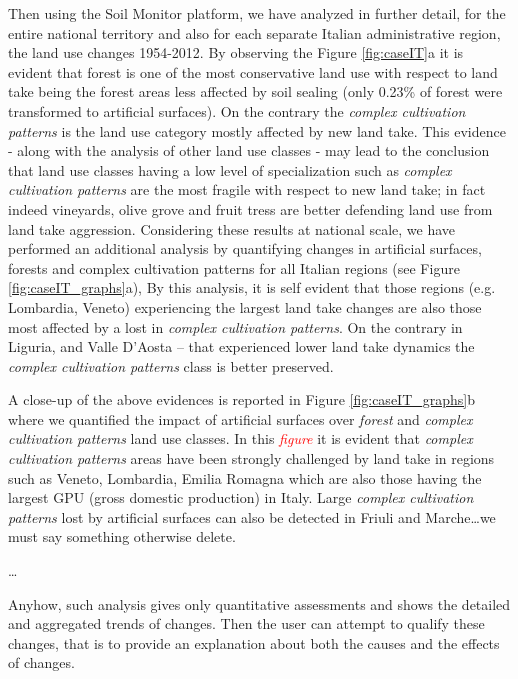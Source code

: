 \documentclass[APA,LATO1COL,doublespace]{WileyNJD-v2}
\newcommand{\toberevised}[1]{\emph{\textcolor{red}{#1}}} %
\begin{document}
Then using the Soil Monitor platform, we have analyzed in further detail, for the entire national territory and also for each separate Italian administrative region, the land use changes 1954-2012.  By observing the Figure \ref{fig:caseIT}a it is evident that forest is one of the most conservative land use with respect to land take being the forest areas less affected by soil sealing (only 0.23\% of forest were transformed to artificial surfaces). On the contrary the \textit{complex cultivation patterns} is the land use category mostly affected by new land take. This evidence - along with the analysis of other land use classes - may lead to the conclusion that land use classes having a low level of specialization such as \textit{complex cultivation patterns} are the most fragile with respect to new land take; in fact indeed vineyards, olive grove and fruit tress are better defending land use from land take aggression. 
Considering these results at national scale, we have performed an additional analysis by quantifying changes in artificial surfaces, forests and complex cultivation patterns for all Italian regions (see Figure \ref{fig:caseIT_graphs}a), By this analysis, it is self evident that those regions (e.g. Lombardia, Veneto) experiencing  the largest land take changes are also those most affected by a lost in \textit{complex cultivation patterns}. On the contrary in Liguria, and Valle D’Aosta – that experienced lower land take dynamics the \textit{complex cultivation patterns} class is better preserved.

A close-up of the above evidences is reported in Figure \ref{fig:caseIT_graphs}b where we quantified the impact of artificial surfaces over \textit{forest} and \textit{complex cultivation patterns} land use classes. In this \toberevised{figure} it is evident that \textit{complex cultivation patterns} areas have been strongly challenged by land take in regions such as Veneto, Lombardia, Emilia Romagna which are also those having the largest GPU (gross domestic production) in Italy. Large \textit{complex cultivation patterns} lost by artificial surfaces can also be detected in Friuli and Marche\ldots we must say something otherwise delete.



\ldots

Anyhow, such analysis gives only quantitative assessments and shows the detailed and aggregated trends of changes.
Then the user can attempt to qualify these changes, that is to provide an explanation about both the causes and the effects of changes.
\end{document}
